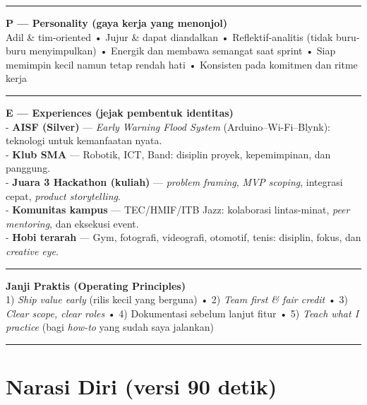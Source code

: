 \documentclass[
  letterpaper,
  DIV=11,
  numbers=noendperiod]{scrreprt}
\begin{document}
\begin{center}\rule{0.5\linewidth}{0.5pt}\end{center}

\textbf{P --- Personality (gaya kerja yang menonjol)}\\
Adil \& tim-oriented • Jujur \& dapat diandalkan • Reflektif-analitis
(tidak buru-buru menyimpulkan) • Energik dan membawa semangat saat
sprint • Siap memimpin kecil namun tetap rendah hati • Konsisten pada
komitmen dan ritme kerja

\begin{center}\rule{0.5\linewidth}{0.5pt}\end{center}

\textbf{E --- Experiences (jejak pembentuk identitas)}\\
- \textbf{AISF (Silver)} --- \emph{Early Warning Flood System}
(Arduino--Wi-Fi--Blynk): teknologi untuk kemanfaatan nyata.\\
- \textbf{Klub SMA} --- Robotik, ICT, Band: disiplin proyek,
kepemimpinan, dan panggung.\\
- \textbf{Juara 3 Hackathon (kuliah)} --- \emph{problem framing},
\emph{MVP scoping}, integrasi cepat, \emph{product storytelling}.\\
- \textbf{Komunitas kampus} --- TEC/HMIF/ITB Jazz: kolaborasi
lintas-minat, \emph{peer mentoring}, dan eksekusi event.\\
- \textbf{Hobi terarah} --- Gym, fotografi, videografi, otomotif, tenis:
disiplin, fokus, dan \emph{creative eye}.

\begin{center}\rule{0.5\linewidth}{0.5pt}\end{center}

\textbf{Janji Praktis (Operating Principles)}\\
1) \emph{Ship value early} (rilis kecil yang berguna) • 2) \emph{Team
first \& fair credit} • 3) \emph{Clear scope, clear roles} • 4)
Dokumentasi sebelum lanjut fitur • 5) \emph{Teach what I practice} (bagi
\emph{how-to} yang sudah saya jalankan)

\begin{center}\rule{0.5\linewidth}{0.5pt}\end{center}

\section{Narasi Diri (versi 90 detik)}\label{narasi-diri-versi-90-detik}
\end{document}
